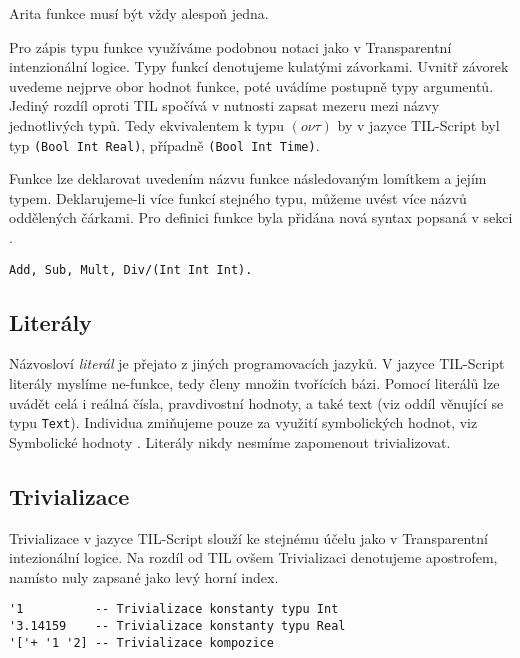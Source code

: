 Arita funkce musí být vždy alespoň jedna.

Pro zápis typu funkce využíváme podobnou notaci jako v Transparentní intenzionální logice.
Typy funkcí denotujeme kulatými závorkami. Uvnitř závorek uvedeme nejprve obor hodnot funkce,
poté uvádíme postupně typy argumentů. Jediný rozdíl oproti TIL spočívá v nutnosti zapsat mezeru
mezi názvy jednotlivých typů. Tedy ekvivalentem k typu $(o\nu\tau)$ by v jazyce TIL-Script byl typ
\lstinline{(Bool Int Real)}, případně \lstinline{(Bool Int Time)}.

Funkce lze deklarovat uvedením názvu funkce následovaným lomítkem a jejím typem. Deklarujeme-li
více funkcí stejného typu, můžeme uvést více názvů oddělených čárkami. Pro definici funkce byla
přidána nová syntax popsaná v sekci .

\begin{lstlisting}[caption={Deklarace funkcí}]
Add, Sub, Mult, Div/(Int Int Int).
\end{lstlisting}

\subsection{Literály}

Názvosloví \textit{literál} je přejato z jiných programovacích jazyků. V jazyce TIL-Script literály
myslíme ne-funkce, tedy členy množin tvořících bázi. Pomocí literálů lze uvádět celá i reálná
čísla, pravdivostní hodnoty, a také text (viz oddíl  věnující se typu
\lstinline{Text}). Individua zmiňujeme pouze za využití symbolických hodnot, viz Symbolické hodnoty
. Literály nikdy nesmíme zapomenout trivializovat.

\subsection{Trivializace}

Trivializace v jazyce TIL-Script slouží ke stejnému účelu jako v Transparentní intezionální logice.
Na rozdíl od TIL ovšem Trivializaci denotujeme apostrofem, namísto nuly zapsané jako levý horní
index.

\begin{lstlisting}[caption={Příklad Trivializace.}]
'1          -- Trivializace konstanty typu Int
'3.14159    -- Trivializace konstanty typu Real
'['+ '1 '2] -- Trivializace kompozice
\end{lstlisting}

